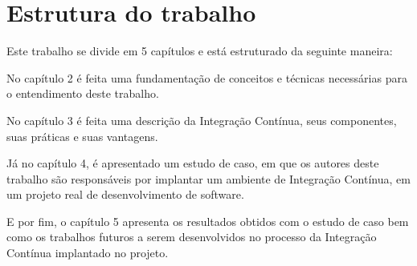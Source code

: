 \section{Estrutura do trabalho}

Este trabalho se divide em 5 capítulos e está estruturado da seguinte maneira:

No capítulo 2 é feita uma fundamentação de conceitos e técnicas necessárias para o entendimento deste trabalho.

No capítulo 3 é feita uma descrição da Integração Contínua, seus componentes, suas práticas e suas vantagens.

Já no capítulo 4, é apresentado um estudo de caso, em que os autores deste trabalho são responsáveis por implantar um ambiente de Integração Contínua, em um projeto real de desenvolvimento de software.

E por fim, o capítulo 5 apresenta os resultados obtidos com o estudo de caso bem como os trabalhos futuros a serem desenvolvidos no processo da Integração Contínua implantado no projeto.
